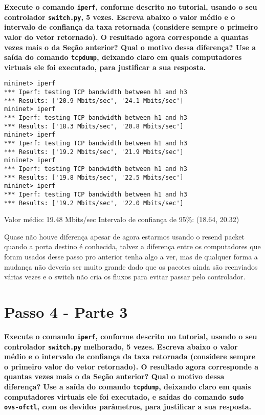 \documentclass[12pt,letterpaper]{article}
\begin{document}
\textbf{Execute o comando \texttt{iperf}, conforme descrito no
tutorial, usando o seu controlador \texttt{switch.py}, 5 vezes.
Escreva abaixo o valor médio e o intervalo de confiança da taxa
retornada (considere sempre o primeiro valor do vetor retornado). O
resultado agora corresponde a quantas vezes mais o da Seção anterior?
Qual o motivo dessa diferença? Use a saída do comando
\texttt{tcpdump}, deixando claro em quais computadores virtuais ele
foi executado, para justificar a sua resposta.}

\begin{verbatim}
mininet> iperf
*** Iperf: testing TCP bandwidth between h1 and h3
*** Results: ['20.9 Mbits/sec', '24.1 Mbits/sec']
mininet> iperf
*** Iperf: testing TCP bandwidth between h1 and h3
*** Results: ['18.3 Mbits/sec', '20.8 Mbits/sec']
mininet> iperf
*** Iperf: testing TCP bandwidth between h1 and h3
*** Results: ['19.2 Mbits/sec', '21.9 Mbits/sec']
mininet> iperf
*** Iperf: testing TCP bandwidth between h1 and h3
*** Results: ['19.8 Mbits/sec', '22.5 Mbits/sec']
mininet> iperf
*** Iperf: testing TCP bandwidth between h1 and h3
*** Results: ['19.2 Mbits/sec', '22.0 Mbits/sec']
\end{verbatim}

Valor médio: 19.48 Mbits/sec
Intervalo de confiança de 95\%: (18.64, 20.32)

Quase não houve diferença apesar de agora estarmos usando o resend packet quando a porta destino é conhecida,
talvez a diferença entre os computadores que foram usados desse passo pro anterior tenha algo a ver, mas de qualquer forma a mudança não deveria ser muito grande dado que os pacotes ainda são reenviados várias vezes e o switch não cria os fluxos para evitar passar pelo controlador.



\section{Passo 4 - Parte 3}

\textbf{Execute o comando \texttt{iperf}, conforme descrito no
tutorial, usando o seu controlador \texttt{switch.py} melhorado, 5
vezes. Escreva abaixo o valor médio e o intervalo de confiança da taxa
retornada (considere sempre o primeiro valor do vetor retornado). O
resultado agora corresponde a quantas vezes mais o da Seção anterior?
Qual o motivo dessa diferença? Use a saída do comando
\texttt{tcpdump}, deixando claro em quais computadores virtuais ele
foi executado, e saídas do comando \texttt{sudo ovs-ofctl}, com os
devidos parâmetros, para justificar a sua resposta.}
\end{document}
